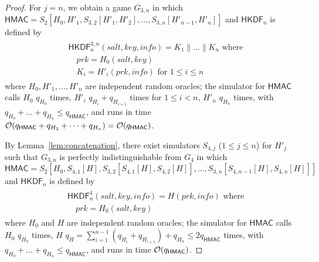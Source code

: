 \documentclass[compsoc, conference, letterpaper, 10pt, times]{IEEEtran}
\newcommand{\HKDF}{\mathsf{HKDF}}
\newcommand{\salt}{\mathit{salt}}
\newcommand{\key}{\mathit{key}}
\newcommand{\info}{\mathit{info}}
\newcommand{\prk}{\mathit{prk}}
\newcommand{\hmac}{\mathsf{HMAC}}
\newcommand{\ab}{\allowbreak}
\begin{document}
\begin{proof}
For $j=n$, we obtain a game $G_{3,n}$  in which
$\hmac = S_2[H_0, H'_1, S_{3,2}[H'_1, H'_2], \dots, S_{3,n}[H'_{n-1}, H'_{n}]]$ and $\HKDF_n$ is defined by
\begin{align*}
\begin{split}
&\HKDF^{3,n}_n(\salt,\key,\info) = K_1 \| \dots \| K_n \text{ where}\\
&\quad \prk = H_0(\salt,\key)\\
&\quad K_i = H'_i(\prk, \info )\text{ for }1 \leq i \leq n
\end{split}
\end{align*}
where $H_0, H'_1, \dots, H'_{n}$ are independent random oracles;
the simulator for $\hmac$ calls 
$H_0$ $q_{H_0}$ times,
$H'_i$ $q_{H_i} + q_{H_{i+1}}$ times for $1 \leq i < n$,
$H'_{n}$ $q_{H_{n}}$ times, with
$q_{H_0} + \dots + q_{H_n} \leq q_{\hmac}$, and runs in time 
${\cal O}(q_{\hmac} + q_{H_2} + \dots + q_{H_{n}}) = {\cal O}(q_{\hmac})$.

By Lemma~\ref{lem:concatenation}, there exist simulators $S_{4,j}$ ($1 \leq j \leq n$) for $H'_j$ such that $G_{3,n}$ is perfectly indistinguishable
from $G_4$ in which
$\hmac = S_2[H_0, \ab S_{4,1}[H], \ab S_{3,2}[S_{4,1}[H], S_{4,2}[H]], \ab \dots, \ab S_{3,n}[S_{4,n-1}[H], S_{4,n}[H]]]$ and $\HKDF_n$ is defined by
\begin{align*}
\begin{split}
&\HKDF^4_n(\salt,\key,\info) = H(\prk, \info) \text{ where}\\
&\quad \prk = H_0(\salt,\key)
\end{split}
\end{align*}
where $H_0$ and $H$ are independent random oracles;
the simulator for $\hmac$ calls 
$H_0$ $q_{H_0}$ times,
$H$ $q_H = \sum_{i = 1}^{n-1} (q_{H_i} + q_{H_{i+1}}) + q_{H_n} \leq 2 q_{\hmac}$ times,
with $q_{H_0} + \dots + q_{H_n} \leq q_{\hmac}$, and runs in time 
${\cal O}(q_{\hmac})$.


\end{proof}
\end{document}
